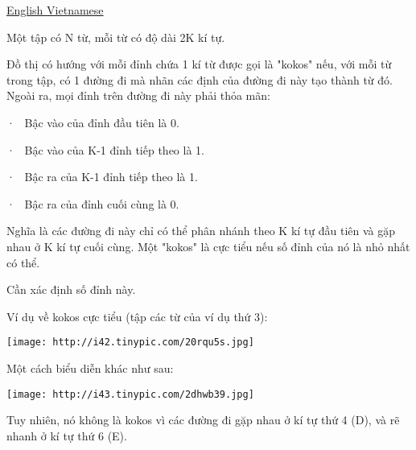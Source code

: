 \href{/problems/show/MKOKOS/en/}{       English      }\href{/problems/show/MKOKOS/vn/}{       Vietnamese      }



   Một tập có N từ, mỗi từ có độ dài 2K kí tự.   


   Đồ thị có hướng với mỗi đỉnh chứa 1 kí từ được gọi là "kokos" nếu, với mỗi từ trong tập, có 1 đường đi mà nhãn các định của đường đi này tạo thành từ đó. Ngoài ra, mọi đỉnh trên đường đi này phải thỏa mãn:  

   ·  Bậc vào của đỉnh đầu tiên là 0.   


   ·  Bậc vào của K-1 đỉnh tiếp theo là 1.   


   ·  Bậc ra của K-1 đỉnh tiếp theo là 1.   


   ·  Bậc ra của đỉnh cuối cùng là 0.  

   Nghĩa là các đường đi này chỉ có thể phân nhánh theo K kí tự đầu tiên và gặp nhau ở K kí tự cuối cùng. Một "kokos" là cực tiểu nếu số đỉnh của nó là nhỏ nhất có thể.  

   Cần xác định số đỉnh này.   





   Ví dụ về kokos cực tiểu (tập các từ của ví dụ thứ 3):  


\texttt{[image: http://i42.tinypic.com/20rqu5s.jpg]}

   Một cách biểu diễn khác như sau:  


\texttt{[image: http://i43.tinypic.com/2dhwb39.jpg]}

   Tuy nhiên, nó không là kokos vì các đường đi gặp nhau ở kí tự thứ 4 (D), và rẽ nhanh ở kí tự thứ 6 (E).